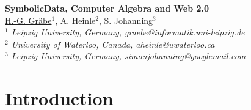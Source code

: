 \documentclass[11pt]{article}
\begin{document}
%
\vspace{-0.8cm}
\begin{flushleft}
\Large \textbf{\noindent
SymbolicData, Computer Algebra and Web 2.0}
\\
\vspace{0.5cm}
\normalsize
\normalsize{
\underline{H.-G. Gr\"abe}$^1$, A. Heinle$^2$, S. Johanning$^3$
} \\
\vspace{5mm}
\textit{\footnotesize
$^1$ Leipzig University, Germany,
graebe@informatik.uni-leipzig.de\\
$^2$ University of Waterloo, Canada,
aheinle@uwaterloo.ca\\
$^3$ Leipzig University, Germany,
simonjohanning@googlemail.com\\
}
\end{flushleft}
\def\SD{\textsc{Symbolic\-Data}}

\section{Introduction}
\end{document}
